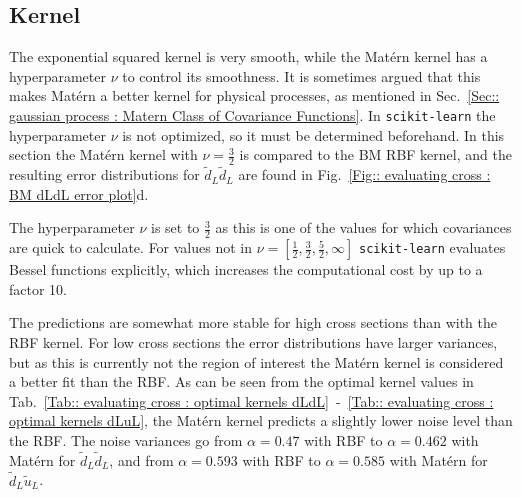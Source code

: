 \documentclass[twoside,english]{uiofysmaster}
\begin{document}



\subsection{Kernel}

The exponential squared kernel is very smooth, while the Mat\'{e}rn kernel has a hyperparameter $\nu$ to control its smoothness. It is sometimes argued that this makes Mat\'{e}rn a better kernel for physical processes, as mentioned in Sec.~\ref{Sec:: gaussian process : Matern Class of Covariance Functions}. In \verb|scikit-learn| the hyperparameter $\nu$ is not optimized, so it must be determined beforehand. In this section the Mat\'{e}rn kernel with $\nu=\frac{3}{2}$ is compared to the BM RBF kernel, and the resulting error distributions for $\tilde{d}_L \tilde{d}_L$ are found in Fig.~\ref{Fig:: evaluating cross : BM dLdL error plot}d. 

The hyperparameter $\nu$ is set to $\frac{3}{2}$ as this is one of the values for which covariances are quick to calculate. For values not in $\nu = [\frac{1}{2}, \frac{3}{2}, \frac{5}{2}, \infty]$ \verb|scikit-learn| evaluates Bessel functions explicitly, which increases the computational cost by up to a factor 10. 

The predictions are somewhat more stable for high cross sections than with the RBF kernel. For low cross sections the error distributions have larger variances, but as this is currently not the region of interest the Mat\'{e}rn kernel is considered a better fit than the RBF. As can be seen from the optimal kernel values in Tab.~\ref{Tab:: evaluating cross : optimal kernels dLdL}~-~\ref{Tab:: evaluating cross : optimal kernels dLuL}, the Mat\'{e}rn kernel predicts a slightly lower noise level than the RBF. The noise variances go from $\alpha = 0.47$ with RBF to $\alpha = 0.462$ with Mat\'{e}rn for $\tilde{d}_L \tilde{d}_L$, and from $\alpha = 0.593$ with RBF to $\alpha = 0.585$ with Mat\'{e}rn for $\tilde{d}_L \tilde{u}_L$. 
\end{document}
